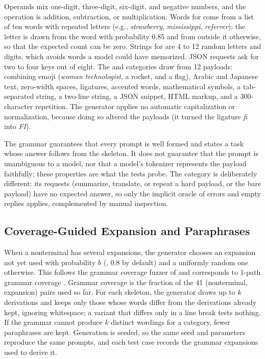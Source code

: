 Operands mix one-digit, three-digit, six-digit, and negative numbers, and the operation is addition, subtraction, or multiplication. Words for  come from a list of ten words with repeated letters (e.g., \emph{strawberry}, \emph{mississippi}, \emph{referrer}); the letter is drawn from the word with probability 0.85 and from outside it otherwise, so that the expected count can be zero. Strings for  are 4 to 12 random letters and digits, which avoids words a model could have memorized. JSON requests ask for two to four keys out of eight. The  and  categories draw from 12 payloads: combining emoji (\emph{woman technologist}, a rocket, and a flag), Arabic and Japanese text, zero-width spaces, ligatures, accented words, mathematical symbols, a tab-separated string, a two-line string, a JSON snippet, HTML markup, and a 300-character repetition. The generator applies no automatic capitalization or normalization, because doing so altered the payloads (it turned the ligature \emph{ﬁ} into \emph{FI}).

The grammar guarantees that every prompt is well formed and states a task whose answer follows from the skeleton. It does not guarantee that the prompt is unambiguous to a model, nor that a model's tokenizer represents the payload faithfully; these properties are what the tests probe. The  category is deliberately different: its requests (summarize, translate, or repeat a hard payload, or the bare payload) have no expected answer, so only the implicit oracle of errors and empty replies applies, complemented by manual inspection.

\subsection{Coverage-Guided Expansion and Paraphrases}

When a nonterminal has several expansions, the generator chooses an expansion not yet used with probability $b$ (, 0.8 by default) and a uniformly random one otherwise. This follows the grammar coverage fuzzer of \citet{zeller2024fuzzingbook} and corresponds to 1-path grammar coverage \citep{havrikov2019kpath}. Grammar coverage is the fraction of the 41 (nonterminal, expansion) pairs used so far. For each skeleton, the generator draws up to $k$ derivations and keeps only those whose words differ from the derivations already kept, ignoring whitespace; a variant that differs only in a line break tests nothing. If the grammar cannot produce $k$ distinct wordings for a category, fewer paraphrases are kept. Generation is seeded, so the same seed and parameters reproduce the same prompts, and each test case records the grammar expansions used to derive it.

